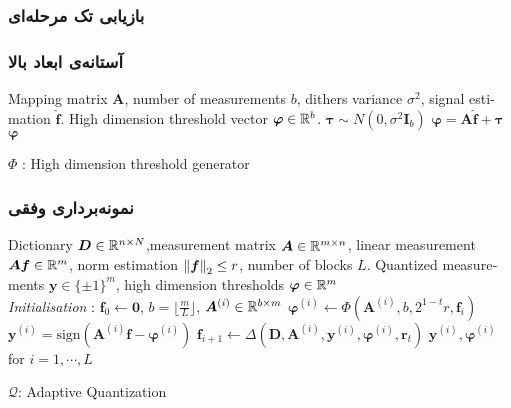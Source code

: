 \begin{frame}
\frametitle{بازیابی تک مرحله‌ای}

\end{frame}

\begin{frame}
\frametitle{آستانه‌ی ابعاد بالا}
\begin{latin}
\begin{algorithm}[H]
\begin{algorithmic}[1]
\renewcommand{\algorithmicrequire}{\textbf{Input:}}
\renewcommand{\algorithmicensure}{\textbf{Output:}}
\REQUIRE Mapping matrix $ \bm{A} $, number of measurements $ b $, dithers variance $ \sigma^{2} $, signal estimation $ \hat{\bm{f}} $.
\ENSURE High dimension threshold vector $\bm{\varphi}\in \mathbb{R}^{b}$.
\STATE $ \bm{\tau}\sim N(0,\sigma^{2}\bm{I}_{b} ) $
\STATE  $ \bm{\varphi}=\bm{A}\hat{\bm{f}}+\bm{\tau} $
\RETURN $ \bm{\varphi} $
\end{algorithmic} 
\caption{ $\Phi$ : High dimension threshold generator}
\label{alg:HDTG}
\end{algorithm}
\end{latin}
\end{frame}

\begin{frame}
\frametitle{نمونه‌برداری وفقی}
\begin{latin}
\begin{algorithm}[H]
\begin{algorithmic}[1]
\REQUIRE Dictionary $ \bm{D}\in\mathbb{R}^{n\times N} $,measurement matrix $ \bm{A}\in\mathbb{R}^{m\times n} $, linear measurement $ \bm{Af}\in \mathbb{R}^{m} $, norm estimation $ \left\lVert\bm{f}\right\rVert_{2}\leq r $, number of blocks $ L $.
\ENSURE  Quantized measurements $ \bm{y} \in \lbrace\pm 1\rbrace^{m} $, high dimension thresholds $ \bm{\varphi} \in \mathbb{R}^{m} $
\\ \textit{Initialisation} : $ \bm{f}_{0}\leftarrow \bm{0} $, $ b = \lfloor\frac{m}{L}\rfloor $, $ \bm{A}^{(i)}\in \mathbb{R}^{b\times m}  $
\STATE $\bm{\varphi}^{\left(i\right)}\leftarrow \Phi(\bm{A}^{(i)},b,2^{1-t}r,\bm{f}_{i}) $
\STATE $ \bm{y}^{\left(i\right)} = \text{sign}\left(\bm{A}^{(i)}\bm{f}-\bm{\varphi}^{\left(i\right)}\right)$
\STATE $ \bm{f}_{i+1}\leftarrow \varDelta\left(\bm{D},\bm{A}^{(i)},\bm{y}^{\left(i\right)},\bm{\varphi}^{\left(i\right)},\bm{r}_{t}\right) $
\ENDFOR
\RETURN $ \bm{y}^{\left(i\right)},\bm{\varphi}^{\left(i\right)} $ for $ i=1,\cdots,L $
\end{algorithmic} 
\caption{$ \mathcal{Q} $: Adaptive Quantization}
\label{alg:AQ}
\end{algorithm}
\end{latin}
\end{frame}

